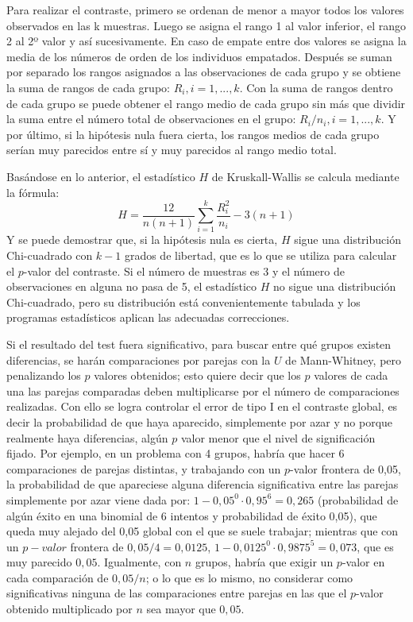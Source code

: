 Para realizar el contraste, primero se ordenan de menor a mayor todos los valores observados en las k muestras. Luego se asigna el rango 1
al valor inferior, el rango 2 al 2º valor y así sucesivamente. En caso de empate entre dos valores se asigna la media de los números de
orden de los individuos empatados. Después se suman por separado los rangos asignados a las observaciones de cada grupo y se obtiene la suma
de rangos de cada grupo: $R_i, i=1,...,k$. Con la suma de rangos dentro de cada grupo se puede obtener el rango medio de cada grupo sin más
que dividir la suma entre el número total de observaciones en el grupo: $R_{i}/n_i, i=1,...,k$. Y por último, si la hipótesis nula fuera
cierta, los rangos medios de cada grupo serían muy parecidos entre sí y muy parecidos al rango medio total.

Basándose en lo anterior, el estadístico $H$ de Kruskall-Wallis se calcula mediante la fórmula:
\[
H = \frac{{12}}{{n\left( {n + 1} \right)}}\sum\limits_{i = 1}^k {\frac{{R_i ^2 }}{{n_i }}}  - 3\left( {n + 1} \right)
\]
Y se puede demostrar que, si la hipótesis nula es cierta, $H$ sigue una distribución Chi-cuadrado con $k-1$ grados de libertad, que es lo
que se utiliza para calcular el $p$-valor del contraste. Si el número de muestras es 3 y el número de observaciones en alguna no pasa de 5,
el estadístico $H$ no sigue una distribución Chi-cuadrado, pero su distribución está convenientemente tabulada y los programas estadísticos
aplican las adecuadas correcciones.

Si el resultado del test fuera significativo, para buscar entre qué grupos existen diferencias, se harán comparaciones por parejas con la
$U$ de Mann-Whitney, pero penalizando los $p$ valores obtenidos; esto quiere decir que los $p$ valores de cada una las parejas comparadas
deben multiplicarse por el número de comparaciones realizadas. Con ello se logra controlar el error de tipo I en el contraste global, es
decir la probabilidad de que haya aparecido, simplemente por azar y no porque realmente haya diferencias, algún $p$ valor menor que el nivel
de significación fijado. Por ejemplo, en un problema con 4 grupos, habría que hacer 6 comparaciones de parejas distintas, y trabajando con
un $p$-valor frontera de 0,05, la probabilidad de que apareciese alguna diferencia significativa entre las parejas simplemente por azar
viene dada por: $1-0,05^0\cdot0,95^6=0,265$ (probabilidad de algún éxito en una binomial de 6 intentos y probabilidad de éxito 0,05), que
queda muy alejado del 0,05 global con el que se suele trabajar; mientras que con un $p-valor$ frontera de $0,05/4=0,0125$,
$1-0,0125^0\cdot0,9875^5=0,073$, que es muy parecido $0,05$. Igualmente, con $n$ grupos, habría que exigir un $p$-valor en cada comparación
de $0,05/n$; o lo que es lo mismo, no considerar como significativas ninguna de las comparaciones entre parejas en las que el $p$-valor
obtenido multiplicado por $n$ sea mayor que $0,05$.


